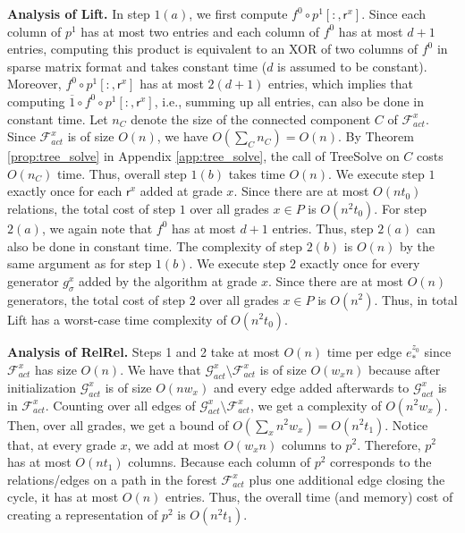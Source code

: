 \documentclass[english,a4paper,nolineno,cleveref]{socg-lipics-v2021}
\newcommand{\G}{\mathcal G}
\newcommand{\F}{\mathcal F}
\def\rsf{\mathsf{r}}
\begin{document}
\vspace{2pt}
{\bf Analysis of {\sc Lift}.} In step $1(a)$, we first compute $f^0\circ p^1[:,\rsf^x]$. Since each column of $p^1$ has at most two entries and each column of $f^0$ has at most $d+1$ entries, computing this product is equivalent to an XOR of two columns of $f^0$ in sparse matrix format and takes constant time ($d$ is assumed to be constant). Moreover,  $f^0\circ p^1[:,\rsf^x]$ has at most $2(d+1)$ entries, which implies that computing $\overline{1}\circ f^0\circ p^1[:,\rsf^x]$, i.e., summing up all entries, can also be done in constant time. Let $n_C$ denote the size of the connected component $C$ of $\mathcal{F}_{act}^x$. Since $\mathcal{F}_{act}^x$ is of size $O(n)$, we have $O(\sum_{C} n_C)=O(n)$. By Theorem \ref{prop:tree_solve} in Appendix \ref{app:tree_solve}, the call of {\sc TreeSolve} on $C$ costs $O(n_C)$ time. Thus, overall step $1(b)$ takes time $O(n)$. We execute step $1$ exactly once for each $\rsf^x$ added at grade $x$. Since there are at most $O(nt_0)$ relations, the total cost of step $1$ over all grades $x\in P$ is $O(n^2t_0)$. For step $2(a)$, we again note that $f^0$ has at most $d+1$ entries. Thus, step $2(a)$ can also be done in constant time. The complexity of step $2(b)$ is $O(n)$ by the same argument as for step $1(b)$. We execute step $2$ exactly once for every generator $g_\sigma^x$ added by the algorithm at grade $x$. Since there are at most $O(n)$ generators, the total cost of step $2$ over all grades $x\in P$ is $O(n^2)$. Thus, in total {\sc Lift} has a worst-case time complexity of $O(n^2t_0)$.

\vspace{2pt}
{\bf Analysis of {\sc RelRel}.} Steps 1 and 2 take at most $O(n)$ time per edge
$e_*^{z_0}$ since $\F_{act}^{x}$ has size $O(n)$. We have that $\G^{x}_{act}\setminus \mathcal{F}_{act}^x$ is of size $O(w_xn)$ because after initialization $\mathcal{G}_{act}^x$ is of size $O(nw_x)$ and every edge added afterwards to $\mathcal{G}_{act}^x$ is in $\mathcal{F}_{act}^x$. Counting over all edges of $\G^{x}_{act}\setminus \mathcal{F}_{act}^x$, we get a complexity of $O(n^2w_x)$. Then, over all grades, we get a bound of $O(\sum_x n^2w_x )=O(n^2t_1)$.
Notice that, at every grade $x$, we add at most $O(w_xn)$ columns to $p^2$. Therefore, $p^2$ has at most $O(nt_1)$ columns. Because each column of $p^2$ corresponds to the relations/edges on a path in the forest $\mathcal{F}_{act}^x$ plus one additional edge closing the cycle, it has at most $O(n)$ entries. Thus, the overall time (and memory) cost of creating a representation of $p^2$ is $O(n^2t_1)$.
\end{document}
